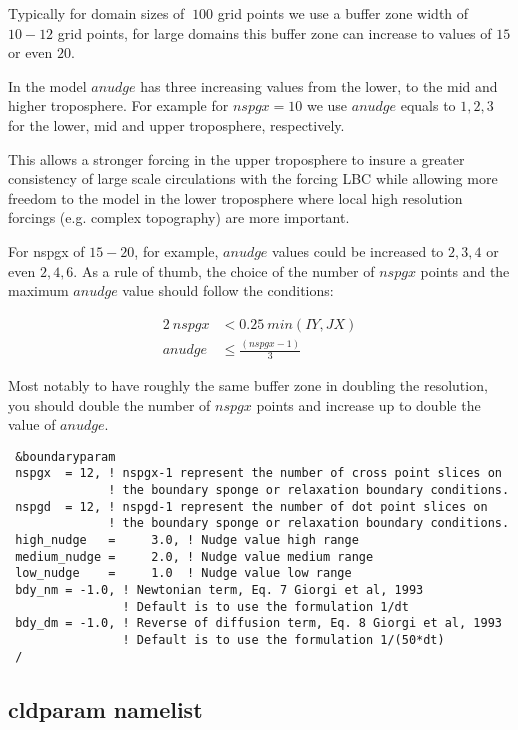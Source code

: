 Typically for domain sizes of $~100$ grid points we use a buffer zone width
of $10-12$ grid points, for large domains this buffer zone can increase to
values of $15$ or even $20$.

In the model $anudge$ has three increasing values from the lower, to the mid
and higher troposphere. For example for $nspgx = 10$ we use $anudge$ equals to
$1, 2, 3$ for the lower, mid and upper troposphere, respectively.

This allows a stronger forcing in the upper troposphere to insure a greater
consistency of large scale circulations with the forcing LBC while allowing
more freedom to the model in the lower troposphere where local high resolution
forcings (e.g. complex topography) are more important.

For nspgx of $15-20$, for example, $anudge$ values could be increased to
$2,3,4$ or even $2,4,6$. As a rule of thumb, the choice of the number of
$nspgx$ points and the maximum $anudge$ value should follow the conditions:

\begin{align}
	2\ nspgx &< 0.25\ min(IY,JX) \\
	anudge &\le \frac{(nspgx-1)}{3}
\end{align}

Most notably to have roughly the same buffer zone in doubling the resolution,
you should double the number of $nspgx$ points and increase up to double the
value of $anudge$.

{\footnotesize
\begin{Verbatim}
 &boundaryparam
 nspgx  = 12, ! nspgx-1 represent the number of cross point slices on
              ! the boundary sponge or relaxation boundary conditions.
 nspgd  = 12, ! nspgd-1 represent the number of dot point slices on
              ! the boundary sponge or relaxation boundary conditions.
 high_nudge   =     3.0, ! Nudge value high range
 medium_nudge =     2.0, ! Nudge value medium range
 low_nudge    =     1.0  ! Nudge value low range
 bdy_nm = -1.0, ! Newtonian term, Eq. 7 Giorgi et al, 1993
                ! Default is to use the formulation 1/dt
 bdy_dm = -1.0, ! Reverse of diffusion term, Eq. 8 Giorgi et al, 1993 
                ! Default is to use the formulation 1/(50*dt)
 /
\end{Verbatim}
}


\subsection{cldparam namelist}

